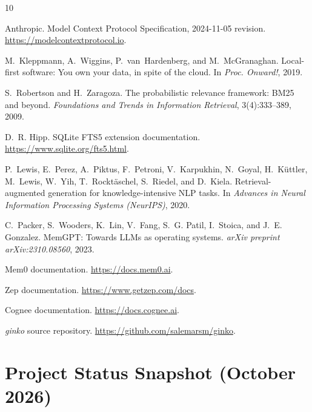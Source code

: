 \documentclass[11pt,a4paper]{article}
\begin{document}
\begin{thebibliography}{10}

Anthropic.
\newblock Model Context Protocol Specification, 2024-11-05 revision.
\newblock \url{https://modelcontextprotocol.io}.

M.~Kleppmann, A.~Wiggins, P.~van~Hardenberg, and M.~McGranaghan.
\newblock Local-first software: You own your data, in spite of the cloud.
\newblock In \emph{Proc. Onward!}, 2019.

S.~Robertson and H.~Zaragoza.
\newblock The probabilistic relevance framework: BM25 and beyond.
\newblock \emph{Foundations and Trends in Information Retrieval}, 3(4):333--389, 2009.

D.~R. Hipp.
\newblock SQLite FTS5 extension documentation.
\newblock \url{https://www.sqlite.org/fts5.html}.

P.~Lewis, E.~Perez, A.~Piktus, F.~Petroni, V.~Karpukhin, N.~Goyal, H.~K{\"u}ttler, M.~Lewis, W.~Yih, T.~Rockt{\"a}schel, S.~Riedel, and D.~Kiela.
\newblock Retrieval-augmented generation for knowledge-intensive NLP tasks.
\newblock In \emph{Advances in Neural Information Processing Systems (NeurIPS)}, 2020.

C.~Packer, S.~Wooders, K.~Lin, V.~Fang, S.~G. Patil, I.~Stoica, and J.~E. Gonzalez.
\newblock MemGPT: Towards LLMs as operating systems.
\newblock \emph{arXiv preprint arXiv:2310.08560}, 2023.

Mem0 documentation.
\newblock \url{https://docs.mem0.ai}.

Zep documentation.
\newblock \url{https://www.getzep.com/docs}.

Cognee documentation.
\newblock \url{https://docs.cognee.ai}.

\textit{ginko} source repository.
\newblock \url{https://github.com/salemarsm/ginko}.

\end{thebibliography}

\appendix
\section{Project Status Snapshot (October 2026)}
\end{document}
